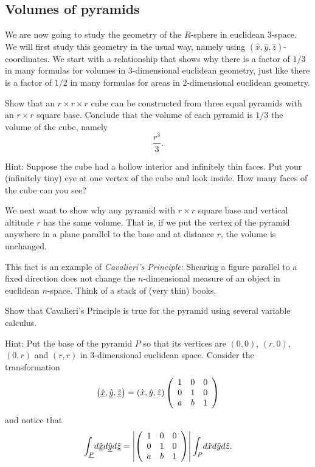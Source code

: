 

\subsection*{Volumes of pyramids}

We are now going to study the geometry of the $R$-sphere in euclidean
$3$-space. We will first study this geometry in the usual way, namely
using $\left( \hat{x},\hat{y},\hat{z}\right) $-coordinates. We start
with a relationship that shows why there is a factor of $1/3$ in many
formulas for volumes in $3$-dimensional euclidean geometry, just like
there is a factor of $1/2$ in many formulas for areas in
$2$-dimensional euclidean geometry.

\begin{exercise} Show that an $r\times r\times r$ cube can be constructed
from three equal pyramids with an $r\times r$ square base. Conclude
that the volume of each pyramid is $1/3$ the volume of the cube,
namely
\[
\frac{r^{3}}{3}.
\]


Hint: Suppose the cube had a hollow interior and infinitely thin
faces. Put your (infinitely tiny) eye at one vertex of the cube and
look inside. How many faces of the cube can you see?
\end{exercise}

We next want to show why any pyramid with $r\times r$ square base and
vertical altitude $r$ has the same volume. That is, if we put the
vertex of the pyramid anywhere in a plane parallel to the base and at
distance $r$, the volume is unchanged.

This fact is an example of \textit{Cavalieri's Principle}: Shearing a
figure parallel to a fixed direction does not change the
$n$-dimensional measure of an object in euclidean $n$-space. Think of
a stack of (very thin) books.

\begin{exercise}
Show that Cavalieri's Principle is true for the pyramid using several
variable calculus.

Hint: Put the base of the pyramid $P$ so that its vertices are $\left(
0,0\right) $, $\left( r,0\right) $, $\left( 0,r\right) $ and $\left(
r,r\right) $ in $3$-dimensional euclidean space. Consider the
transformation%
\[
\left(  \underline{\hat{x}},\underline{\hat{y}},\underline{\hat{z}}\right)
=\left(  \hat{x},\hat{y},\hat{z}\right)  \left(
\begin{array}
[c]{ccc}%
1 & 0 & 0\\
0 & 1 & 0\\
a & b & 1
\end{array}
\right)
\]
and notice that%
\[
{\displaystyle\int\nolimits_{\underline{P}}}
d\underline{\hat{x}}d\underline{\hat{y}}d\underline{\hat{z}}=\left\vert
\left(
\begin{array}
[c]{ccc}%
1 & 0 & 0\\
0 & 1 & 0\\
a & b & 1
\end{array}
\right)  \right\vert
{\displaystyle\int\nolimits_{P}}
d\hat{x}d\hat{y}d\hat{z}.
\]
\end{exercise}

